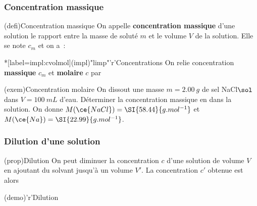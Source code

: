 \documentclass[../../main/main.tex]{subfiles}
\begin{document}
\subsubsection{Concentration massique}

\begin{tcbraster}[raster columns=2, raster equal height=rows]
	\begin{tcb}[label=def:cmol](defi){Concentration massique}
		On appelle \textbf{concentration massique} d'une solution le
		rapport entre la masse de soluté $m$ et le volume $V$ de
		la solution. Elle se note $c_m$ et on a~:
		\psw{
			\[
				\boxed{c_m = \frac{m}{V}}
				\qen
				\si{g.L^{-1}}
			\]
		}
		\vspace{-15pt}
	\end{tcb}
	\begin{tcb}*[label=impl:cvolmol](impl)"limp"'r'{Concentrations}
		On relie concentration \textbf{massique} $c_m$ et \textbf{molaire} $c$ par
		\psw{
			\[ \boxed{c_m = cM}\]
		}
		\vspace{-15pt}
	\end{tcb}
\end{tcbraster}

\begin{tcb}[label=exem:cmol](exem){Concentration molaire}
	On dissout une masse $m = \SI{2.00}{g}$ de sel NaCl$\sol$ dans
	$V = \SI{100}{mL}$ d'eau.
	\smallbreak
	Déterminer la concentration massique en  dans la solution.
	\smallbreak
	On donne
	$M(\ce{NaCl}) = \SI{58.44}{g.mol^{-1}}$ et
	$M(\ce{Na}) = \SI{22.99}{g.mol^{-1}}$.
	\tcblower
\end{tcb}

\vspace{-20pt}
\subsubsection{Dilution d'une solution}

\begin{tcbraster}[raster columns=2, raster equal height=rows]
	\begin{tcb}[label=prop:dilu](prop){Dilution}
		On peut diminuer la concentration $c$ d'une solution de volume $V$ en
		ajoutant du solvant jusqu'à un volume $V'$. La concentration $c'$
		obtenue est alors
		\psw{
			\[
				\boxed{cV = c'V'}
				\Lra
				\boxed{\frac{c}{c'} = \frac{V'}{V}}
			\]
		}
	\end{tcb}
	\begin{tcb}[label=demo:dilu](demo)'r'{Dilution}
	\end{tcb}
\end{tcbraster}
\end{document}
